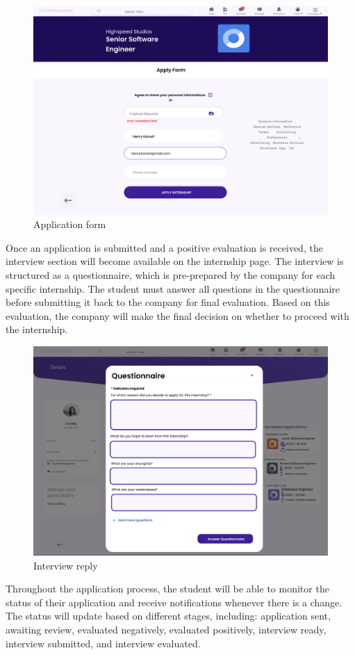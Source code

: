 \begin{figure} [H]
    \centering
    \includegraphics[width=0.5\linewidth]{Images/Interface Images/student interface/Screenshot 2024-12-12 045639.png}
    \caption{Application form}
    \label{fig:Application form}
\end{figure}

Once an application is submitted and a positive evaluation is received, the interview section will become available on the internship page. The interview is structured as a questionnaire, which is pre-prepared by the company for each specific internship. The student must answer all questions in the questionnaire before submitting it back to the company for final evaluation. Based on this evaluation, the company will make the final decision on whether to proceed with the internship.


\begin{figure} [H]
    \centering
    \includegraphics[width=0.5\linewidth]{Images/Interface Images/student interface/Screenshot 2024-12-12 045852.png}
    \caption{Interview reply}
    \label{fig:Interview reply}
\end{figure}

Throughout the application process, the student will be able to monitor the status of their application and receive notifications whenever there is a change. The status will update based on different stages, including: application sent, awaiting review, evaluated negatively, evaluated positively, interview ready, interview submitted, and interview evaluated.

